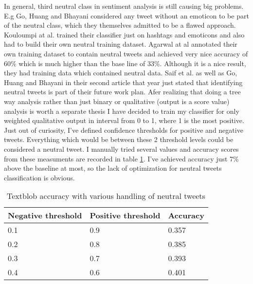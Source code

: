 In general, third neutral class in sentiment analysis is still causing big problems. E.g Go, Huang and Bhayani \cite{go2009twitter2} considered any tweet without an emoticon to be part of the neutral class, which they themselves admitted to be a flawed approach. Kouloumpi at al. \cite{kouloumpis2011twitter} trained their classifier just on hashtags and emoticons and also had to build their own neutral training dataset.  Agarwal at al \cite{agarwal2011sentiment} annotated their own training dataset to contain neutral tweets and achieved very nice accuracy of 60\% which is much higher than the base line of 33\%. Although it is a nice result, they had training data which contained neutral data. Saif et al. \cite{saif2012semantic} as well as Go, Huang and Bhayani \cite{go2009twitter} in their second article that year just stated that identifying neutral tweets is part of their future work plan.  Afer realizing that doing a tree way analysis rather than just binary or qualitative (output is a score value) analysis is worth a separate thesis I have decided to train my classifier for only weighted qualitative output in interval from 0 to 1, where 1 is the most positive. Just out of curiosity, I've     defined confidence thresholds for positive and negative tweets. Everything which would be between these 2 threshold levels could be considered a neutral tweet. I manually tried several values and accuracy scores from these measuments are recorded in table \ref{table:negativeAccuracy}. I've achieved accuracy just 7\% above the baseline at most, so the lack of optimization for neutral tweets classification is obvious.


\begin{table}[H]
\centering
\begin{tabular}{|p{4cm}|p{4cm}|p{3cm}|}
 \hline
\textbf{ Negative threshold }& \textbf{Positive threshold} & \textbf{Accuracy}\\
 \hline
 0.1 & 0.9 & 0.357\\ \hline
 0.2 & 0.8 & 0.385\\ \hline
 0.3 & 0.7 & 0.393\\ \hline 
 0.4 & 0.6 & 0.401\\ \hline 
\end{tabular}
\caption{Textblob accuracy with various handling of neutral tweets}
\label{table:negativeAccuracy}
\end{table}

